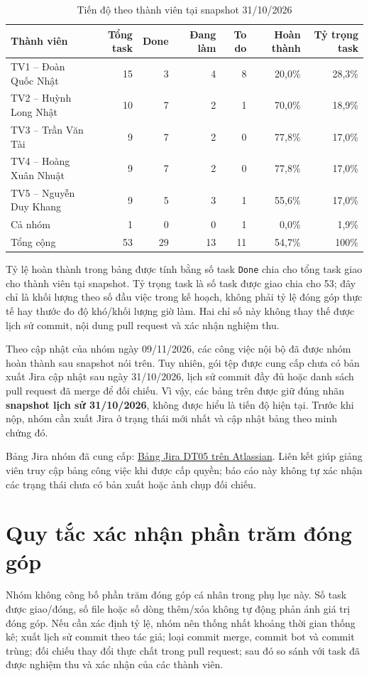 \begin{table}[H]
\centering
\caption{Tiến độ theo thành viên tại snapshot 31/10/2026}
\small
\begin{tabular}{@{}lrrrrrr@{}}
\toprule
\textbf{Thành viên} & \textbf{Tổng task} & \textbf{Done} & \textbf{Đang làm} & \textbf{To do} & \textbf{Hoàn thành} & \textbf{Tỷ trọng task} \\
\midrule
TV1 -- Đoàn Quốc Nhật & 15 & 3 & 4 & 8 & 20,0\% & 28,3\% \\
TV2 -- Huỳnh Long Nhật & 10 & 7 & 2 & 1 & 70,0\% & 18,9\% \\
TV3 -- Trần Văn Tài & 9 & 7 & 2 & 0 & 77,8\% & 17,0\% \\
TV4 -- Hoàng Xuân Nhuật & 9 & 7 & 2 & 0 & 77,8\% & 17,0\% \\
TV5 -- Nguyễn Duy Khang & 9 & 5 & 3 & 1 & 55,6\% & 17,0\% \\
Cả nhóm & 1 & 0 & 0 & 1 & 0,0\% & 1,9\% \\
\midrule
Tổng cộng & 53 & 29 & 13 & 11 & 54,7\% & 100\% \\
\bottomrule
\end{tabular}
\end{table}

Tỷ lệ hoàn thành trong bảng được tính bằng số task \texttt{Done} chia cho tổng task giao cho thành viên tại snapshot. Tỷ trọng task là số task được giao chia cho 53; đây chỉ là khối lượng theo số đầu việc trong kế hoạch, không phải tỷ lệ đóng góp thực tế hay thước đo độ khó/khối lượng giờ làm. Hai chỉ số này không thay thế được lịch sử commit, nội dung pull request và xác nhận nghiệm thu.

Theo cập nhật của nhóm ngày 09/11/2026, các công việc nội bộ đã được nhóm hoàn thành sau snapshot nói trên. Tuy nhiên, gói tệp được cung cấp chưa có bản xuất Jira cập nhật sau ngày 31/10/2026, lịch sử commit đầy đủ hoặc danh sách pull request đã merge để đối chiếu. Vì vậy, các bảng trên được giữ đúng nhãn \textbf{snapshot lịch sử 31/10/2026}, không được hiểu là tiến độ hiện tại. Trước khi nộp, nhóm cần xuất Jira ở trạng thái mới nhất và cập nhật bảng theo minh chứng đó.

Bảng Jira nhóm đã cung cấp: \href{https://st-team-mdi9ncf5.atlassian.net/jira/software/projects/DT05/list}{Bảng Jira DT05 trên Atlassian}. Liên kết giúp giảng viên truy cập bảng công việc khi được cấp quyền; báo cáo này không tự xác nhận các trạng thái chưa có bản xuất hoặc ảnh chụp đối chiếu.

\section*{Quy tắc xác nhận phần trăm đóng góp}
Nhóm không công bố phần trăm đóng góp cá nhân trong phụ lục này. Số task được giao/đóng, số file hoặc số dòng thêm/xóa không tự động phản ánh giá trị đóng góp. Nếu cần xác định tỷ lệ, nhóm nên thống nhất khoảng thời gian thống kê; xuất lịch sử commit theo tác giả; loại commit merge, commit bot và commit trùng; đối chiếu thay đổi thực chất trong pull request; sau đó so sánh với task đã được nghiệm thu và xác nhận của các thành viên.

